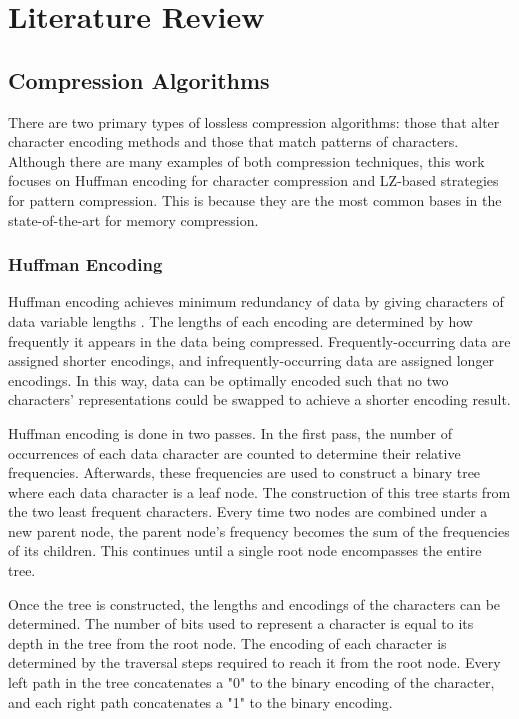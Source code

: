 \documentclass[doublespace,draft,nopageskip]{VTthesis} %
\begin{document}
\chapter{Literature Review} \label{ch:literature_review}
\section{Compression Algorithms}\label{se:compression_algorithms}
There are two primary types of lossless compression algorithms: those that alter character encoding methods and those that match patterns of characters. Although there are many examples of both compression techniques, this work focuses on Huffman encoding for character compression and LZ-based strategies for pattern compression. This is because they are the most common bases in the state-of-the-art for memory compression.

\subsection{Huffman Encoding}\label{ss:huffman_encoding}
Huffman encoding achieves minimum redundancy of data by giving characters of data variable lengths \cite{huffman}. The lengths of each encoding are determined by how frequently it appears in the data being compressed. Frequently-occurring data are assigned shorter encodings, and infrequently-occurring data are assigned longer encodings. In this way, data can be optimally encoded such that no two characters' representations could be swapped to achieve a shorter encoding result. 

Huffman encoding is done in two passes. In the first pass, the number of occurrences of each data character are counted to determine their relative frequencies. Afterwards, these frequencies are used to construct a binary tree where each data character is a leaf node. The construction of this tree starts from the two least frequent characters. Every time two nodes are combined under a new parent node, the parent node's frequency becomes the sum of the frequencies of its children. This continues until a single root node encompasses the entire tree.

Once the tree is constructed, the lengths and encodings of the characters can be determined. The number of bits used to represent a character is equal to its depth in the tree from the root node. The encoding of each character is determined by the traversal steps required to reach it from the root node. Every left path in the tree concatenates a "0" to the binary encoding of the character, and each right path concatenates a "1" to the binary encoding.
\end{document}

